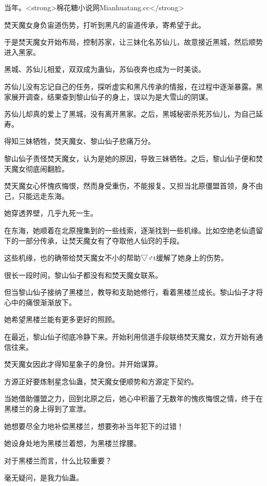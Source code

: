 
\begin{this_body}

当年。<strong>棉花糖小说网Mianhuatang.cc</strong>

焚天魔女身负宙道伤势，打听到黑凡的宙道传承，寄希望于此。

于是焚天魔女开始布局，控制苏家，让三妹化名苏仙儿，故意接近黑城，然后顺势进入黑家。

黑城、苏仙儿相爱，双双成为蛊仙，苏仙夜奔也成为一时美谈。

苏仙儿没有忘记自己的任务，探听虚实和黑凡传承的情报，在过程中逐渐暴露。黑家展开调查，结果查到黎山仙子的身上，误以为是大雪山的阴谋。

苏仙儿却真的爱上了黑城，没有离开黑家。之后，黑城秘密杀死苏仙儿，为自己延寿。

得知三妹牺牲，焚天魔女、黎山仙子悲痛万分。

黎山仙子责怪焚天魔女，认为是她的原因，导致三妹牺牲。之后，黎山仙子便和焚天魔女彻底闹翻脸。

焚天魔女心怀愧疚悔恨，然而身受重伤，不能报复。又担当北原僵盟首领，身不由己，只能远走东海。

她穿透界壁，几乎九死一生。

在东海，她顺着在北原搜集到的一些线索，逐渐找到一些机缘。比如空绝老仙遗留下的一部分传承，让焚天魔女有了夺取他人仙窍的手段。

这些机缘，也的确带给焚天魔女不小的帮助▽♂t缓解了她身上的伤势。

很长一段时间，黎山仙子都没有和焚天魔女联系。

但当黎山仙子接纳了黑楼兰，教导和支助她修行，看着黑楼兰成长。黎山仙子才将心中的痛恨渐渐放下。

她希望黑楼兰能有更多更好的照顾。

在最近，黎山仙子彻底冷静下来。开始利用信道手段联络焚天魔女，双方开始有通信往来。

焚天魔女因此才得知星象子的身份。并开始谋算。

方源正好要炼制星念仙蛊，焚天魔女便顺势和方源定下契约。

当她借助僵盟之力，回到北原之后，她心中积蓄了无数年的愧疚悔恨之情，终于在黑楼兰的身上得到了宣泄。

她想要尽全力地补偿黑楼兰，想要弥补当年犯下的过错！

她设身处地为黑楼兰着想，为黑楼兰撑腰。

对于黑楼兰而言，什么比较重要？

毫无疑问，是我力仙蛊。


\end{this_body}
